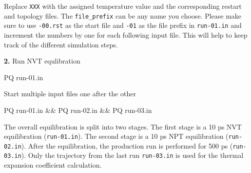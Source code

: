 \documentclass[
  letterpaper,
]{article}
\newenvironment{Shaded}{\begin{snugshade}}{\end{snugshade}}
\newcommand{\ExtensionTok}[1]{\textcolor[rgb]{0.00,0.23,0.31}{#1}}
\newcommand{\KeywordTok}[1]{\textcolor[rgb]{0.00,0.23,0.31}{#1}}
\newcommand{\NormalTok}[1]{\textcolor[rgb]{0.00,0.23,0.31}{#1}}
\begin{document}
\begin{tcolorbox}[enhanced jigsaw, toptitle=1mm, opacitybacktitle=0.6, colframe=quarto-callout-note-color-frame, toprule=.15mm, breakable, bottomrule=.15mm, left=2mm, title=\textcolor{quarto-callout-note-color}{\faInfo}\hspace{0.5em}{Note}, titlerule=0mm, leftrule=.75mm, bottomtitle=1mm, coltitle=black, arc=.35mm, rightrule=.15mm, opacityback=0, colback=white, colbacktitle=quarto-callout-note-color!10!white]

Replace \texttt{XXX} with the assigned temperature value and the
corresponding restart and topology files. The \texttt{file\_prefix} can
be any name you choose. Please make sure to use \texttt{-00.rst} as the
start file and \texttt{-01} as the file prefix in \texttt{run-01.in} and
increment the numbers by one for each following input file. This will
help to keep track of the different simulation steps.

\end{tcolorbox}

\textbf{2.} Run NVT equlibration

\begin{Shaded}
\begin{Highlighting}[]
\ExtensionTok{PQ}\NormalTok{ run{-}01.in}
\end{Highlighting}
\end{Shaded}

Start multiple input files one after the other

\begin{Shaded}
\begin{Highlighting}[]
\ExtensionTok{PQ}\NormalTok{ run{-}01.in }\KeywordTok{\&\&} \ExtensionTok{PQ}\NormalTok{ run{-}02.in }\KeywordTok{\&\&} \ExtensionTok{PQ}\NormalTok{ run{-}03.in}
\end{Highlighting}
\end{Shaded}

\begin{tcolorbox}[enhanced jigsaw, toptitle=1mm, opacitybacktitle=0.6, colframe=quarto-callout-important-color-frame, toprule=.15mm, breakable, bottomrule=.15mm, left=2mm, title=\textcolor{quarto-callout-important-color}{\faExclamation}\hspace{0.5em}{Important}, titlerule=0mm, leftrule=.75mm, bottomtitle=1mm, coltitle=black, arc=.35mm, rightrule=.15mm, opacityback=0, colback=white, colbacktitle=quarto-callout-important-color!10!white]

The overall equilibration is split into two stages. The first stage is a
10 ps NVT equilibration (\texttt{run-01.in}). The second stage is a 10
ps NPT equilibration (\texttt{run-02.in}). After the equilibration, the
production run is performed for 500 ps (\texttt{run-03.in}). Only the
trajectory from the last run \texttt{run-03.in} is used for the thermal
expansion coefficient calculation.

\end{tcolorbox}
\end{document}
